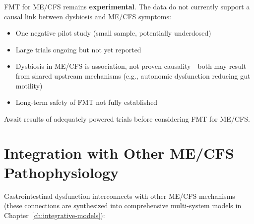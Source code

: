 \begin{limitation}
FMT for ME/CFS remains \textbf{experimental}. The data do not currently support a causal link between dysbiosis and ME/CFS symptoms:
\begin{itemize}
    \item One negative pilot study (small sample, potentially underdosed)
    \item Large trials ongoing but not yet reported
    \item Dysbiosis in ME/CFS is association, not proven causality---both may result from shared upstream mechanisms (e.g., autonomic dysfunction reducing gut motility)
    \item Long-term safety of FMT not fully established
\end{itemize}
Await results of adequately powered trials before considering FMT for ME/CFS.
\end{limitation}

\section{Integration with Other ME/CFS Pathophysiology}
\label{sec:gi-integration}

Gastrointestinal dysfunction interconnects with other ME/CFS mechanisms (these connections are synthesized into comprehensive multi-system models in Chapter~\ref{ch:integrative-models}):

